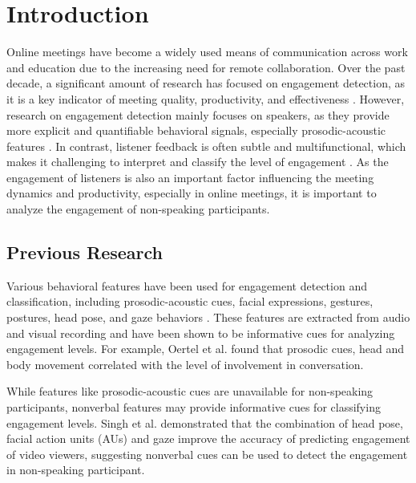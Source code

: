 \documentclass[
]{ceurart}
\begin{document}
\section{Introduction}
Online meetings have become a widely used means of communication across work and education due to the increasing need for remote collaboration. Over the past decade, a significant amount of research has focused on engagement detection, as it is a key indicator of meeting quality, productivity, and effectiveness \cite{frank2016engagement}. However, research on engagement detection mainly focuses on speakers, as they provide more explicit and quantifiable behavioral signals, especially prosodic-acoustic features \cite{pelletrostaing2023multimodal}. In contrast, listener feedback is often subtle and multifunctional, which makes it challenging to interpret and classify the level of engagement \cite{pelletrostaing2023multimodal}. As the engagement of listeners is also an important factor influencing the meeting dynamics and productivity, especially in online meetings, it is important to analyze the engagement of non-speaking participants.

\subsection{Previous Research}
Various behavioral features have been used for engagement detection and classification, including prosodic-acoustic cues, facial expressions, gestures, postures, head pose, and gaze behaviors \cite{oertel2011towards} \cite{singh2023attention} \cite{inoue2018engagement}. These features are extracted from audio and visual recording and have been shown to be informative cues for analyzing engagement levels. For example, Oertel et al. \cite{oertel2011towards} found that prosodic cues, head and body movement correlated with the level of involvement in conversation. 

While features like prosodic-acoustic cues are unavailable for non-speaking participants, nonverbal features may provide informative cues for classifying engagement levels. Singh et al.\cite{singh2023attention} demonstrated that the combination of head pose, facial action units (AUs) and gaze improve the accuracy of predicting engagement of video viewers, suggesting nonverbal cues can be used to detect the engagement in non-speaking participant.
\end{document}
